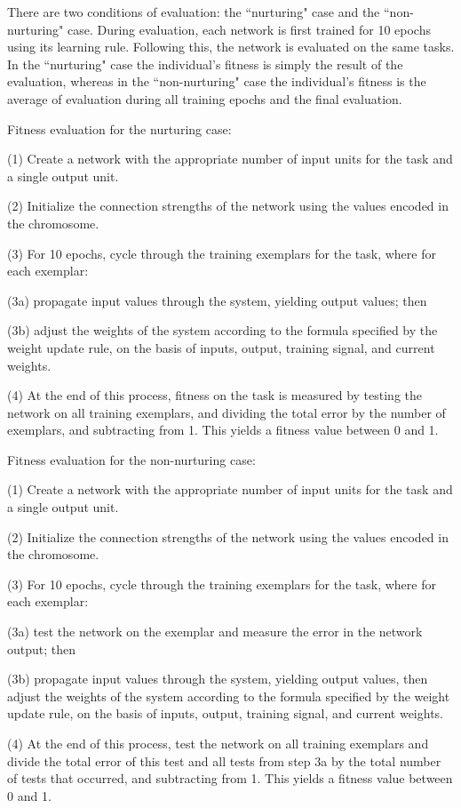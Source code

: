 \documentclass[master]{outhesis}
\begin{document}
There are two conditions of evaluation: the ``nurturing" case and the ``non-nurturing" case. During evaluation, each network is first trained for 10 epochs using its learning rule. Following this, the network is evaluated on the same tasks. In the ``nurturing" case the individual's fitness is simply the result of the evaluation, whereas in the ``non-nurturing" case the individual's fitness is the average of evaluation during all training epochs and the final evaluation.

Fitness evaluation for the nurturing case:

(1) Create a network with the appropriate number of input units for the task and a single output unit.

(2) Initialize the connection strengths of the network using the values encoded in the chromosome.

(3) For 10 epochs, cycle through the training exemplars for the task, where for each exemplar:

(3a) propagate input values through the system, yielding output values; then

(3b) adjust the weights of the system according to the formula specified by the weight update rule, on the basis of inputs, output, training signal, and current weights.

(4) At the end of this process, fitness on the task is measured by testing the network on all training exemplars, and dividing the total error by the number of exemplars, and subtracting from 1. This yields a fitness value between 0 and 1.

Fitness evaluation for the non-nurturing case:

(1) Create a network with the appropriate number of input units for the task and a single output unit.

(2) Initialize the connection strengths of the network using the values encoded in the chromosome.

(3) For 10 epochs, cycle through the training exemplars for the task, where for each exemplar:

(3a) test the network on the exemplar and measure the error in the network output; then

(3b) propagate input values through the system, yielding output values, then adjust the weights of the system according to the formula specified by the weight update rule, on the basis of inputs, output, training signal, and current weights.

(4) At the end of this process, test the network on all training exemplars and divide the total error of this test and all tests from step 3a by the total number of tests that occurred, and subtracting from 1. This yields a fitness value between 0 and 1.
\end{document}
